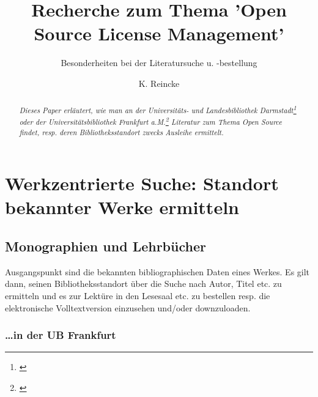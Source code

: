 \documentclass[DIV=calc,BCOR=5mm,11pt,headings=small,oneside,abstract=false, toc=bib]{scrartcl}
\begin{document}
\nocite{*}

\titlehead{\textbf{O}pen \textbf{S}ource \textbf{Li}cense \textbf{C}ompendium}
\subject{Die Uni-Bibliotheken DA und FaM}
\title{Recherche zum Thema 'Open Source License Management'}
\subtitle{Besonderheiten bei der Literatursuche u. -bestellung}
\author{K. Reincke}
\maketitle

\begin{abstract}
\noindent \itshape
Dieses Paper erläutert, wie man an der \emph{Universitäts- und Landesbibliothek
Darmstadt}\footnote{\cite[s.][]{UlbDaHome}} oder der
\emph{Universitätsbibliothek Frankfurt a.M.}\footnote{\cite[s.][]{UbFaMHome}}
Literatur zum Thema \emph{Open Source} findet, resp. deren Bibliotheksstandort
zwecks Ausleihe ermittelt.
\end{abstract}

\footnotesize
\tableofcontents
\normalsize

\section{Werkzentrierte Suche: Standort bekannter Werke ermitteln}

\subsection{Monographien und Lehrbücher}

Ausgangspunkt sind die bekannten bibliographischen Daten eines Werkes. Es gilt
dann, seinen Bibliotheksstandort über die Suche nach Autor, Titel etc. zu
ermitteln und es zur Lektüre \glqq{}in den Lesesaal\grqq{} etc. zu bestellen
resp. die elektronische Volltextversion einzusehen und/oder downzuloaden.

\subsubsection{\ldots in der UB Frankfurt}
\end{document}
